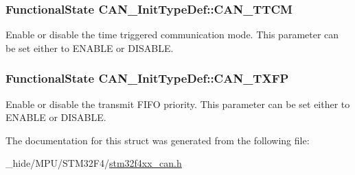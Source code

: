 \subsubsection[{C\+A\+N\+\_\+\+T\+T\+C\+M}]{\setlength{\rightskip}{0pt plus 5cm}Functional\+State C\+A\+N\+\_\+\+Init\+Type\+Def\+::\+C\+A\+N\+\_\+\+T\+T\+C\+M}\label{struct_c_a_n___init_type_def_aa53ceafdcf1a9a5c9a6566006c9a4b60}
Enable or disable the time triggered communication mode. This parameter can be set either to E\+N\+A\+B\+L\+E or D\+I\+S\+A\+B\+L\+E. \hypertarget{struct_c_a_n___init_type_def_a003de4b70fc93b4f820f320c6ea75a16}{}
\subsubsection[{C\+A\+N\+\_\+\+T\+X\+F\+P}]{\setlength{\rightskip}{0pt plus 5cm}Functional\+State C\+A\+N\+\_\+\+Init\+Type\+Def\+::\+C\+A\+N\+\_\+\+T\+X\+F\+P}\label{struct_c_a_n___init_type_def_a003de4b70fc93b4f820f320c6ea75a16}
Enable or disable the transmit F\+I\+F\+O priority. This parameter can be set either to E\+N\+A\+B\+L\+E or D\+I\+S\+A\+B\+L\+E. 

The documentation for this struct was generated from the following file\+:\begin{DoxyCompactItemize}
\item 
\+\_\+hide/\+M\+P\+U/\+S\+T\+M32\+F4/\hyperlink{stm32f4xx__can_8h}{stm32f4xx\+\_\+can.\+h}\end{DoxyCompactItemize}
